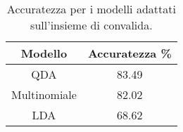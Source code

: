 \begin{table}[H]
\centering
\caption{Accuratezza per i modelli adattati sull'insieme di convalida.}
\begin{tabular}{cc}
\toprule
      Modello &  Accuratezza \% \\
\midrule
          QDA &          83.49 \\
 Multinomiale &          82.02 \\
          LDA &          68.62 \\
\bottomrule
\end{tabular}
\label{tab:acc_pen}
\end{table}